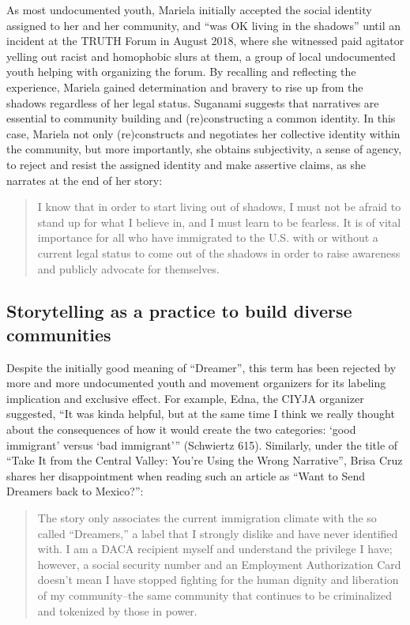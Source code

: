 \documentclass[12pt]{article}
\begin{document}
\begin{flushleft}
As most undocumented youth, Mariela initially accepted the social identity assigned to her and her community, and ``was OK living in the shadows'' until an incident at the TRUTH Forum in August 2018, where she witnessed paid agitator yelling out racist and homophobic slurs at them, a group of local undocumented youth helping with organizing the forum.
By recalling and reflecting the experience, Mariela gained determination and bravery to rise up from the shadows regardless of her legal status.
Suganami suggests that narratives are essential to community building and (re)constructing a common identity. %
In this case, Mariela not only (re)constructs and negotiates her collective identity within the community, but more importantly, she obtains subjectivity, a sense of agency, to reject and resist the assigned identity and make assertive claims, as she narrates at the end of her story:

\begin{quotation}
    \noindent
    I know that in order to start living out of shadows, I must not be afraid to stand up for what I believe in, and I must learn to be fearless.
    It is of vital importance for all who have immigrated to the U.S. with or without a current legal status to come out of the shadows in order to raise awareness and publicly advocate for themselves.
\end{quotation} %

\subsection*{Storytelling as a practice to build diverse communities}

Despite the initially good meaning of “Dreamer”, this term has been rejected by more and more undocumented youth and movement organizers for its labeling implication and exclusive effect.
For example, Edna, the CIYJA organizer suggested, 
    ``It was kinda helpful, but at the same time I think we really thought about the consequences of how it would create the two categories: `good immigrant' versus `bad immigrant''' (Schwiertz 615). %
Similarly, under the title of ``Take It from the Central Valley: You're Using the Wrong Narrative'', Brisa Cruz shares her disappointment when reading such an article as ``Want to Send Dreamers back to Mexico?'':

\begin{quotation}
    \noindent
    The story only associates the current immigration climate with the so called ``Dreamers,'' a label that I strongly dislike and have never identified with.
    I am a DACA recipient myself and understand the privilege I have; however, a social security number and an Employment Authorization Card doesn’t mean I have stopped fighting for the human dignity and liberation of my community--the same community that continues to be criminalized and tokenized by those in power.
\end{quotation} %


\end{flushleft}
\end{document}
